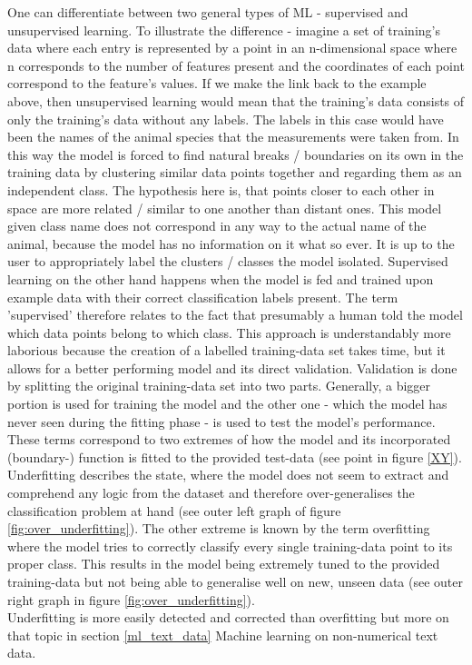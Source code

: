 One can differentiate between two general types of ML - supervised and unsupervised learning. To illustrate the difference - imagine a set of training's data where each entry is represented by a point in an n-dimensional space where n corresponds to the number of features present and the coordinates of each point correspond to the feature's values. If we make the link back to the example above, then unsupervised learning would mean that the training's data consists of only the training's data without any labels. The labels in this case would have been the names of the animal species that the measurements were taken from. In this way the model is forced to find natural breaks / boundaries on its own in the training data by clustering similar data points together and regarding them as an independent class. The hypothesis here is, that points closer to each other in space are more related / similar to one another than distant ones. This model given class name does not correspond in any way to the actual name of the animal, because the model has no information on it what so ever. It is up to the user to appropriately label the clusters / classes the model isolated.
Supervised learning on the other hand happens when the model is fed and trained upon example data with their correct classification labels present. The term 'supervised' therefore relates to the fact that presumably a human told the model which data points belong to which class. This approach is understandably more laborious because the creation of a labelled training-data set takes time, but it allows for a better performing model and its direct validation. Validation is done by splitting the original training-data set into two parts. Generally, a bigger portion is used for training the model and the other one - which the model has never seen during the fitting phase - is used to test the model's performance.\\
\newline
These terms correspond to two extremes of how the model and its incorporated (boundary-) function is fitted to the provided test-data (see point in figure \ref{XY}). Underfitting describes the state, where the model does not seem to extract and comprehend any logic from the dataset and therefore over-generalises the classification problem at hand (see outer left graph of figure \ref{fig:over_underfitting}). The other extreme is known by the term overfitting where the model tries to correctly classify every single training-data point to its proper class. This results in the model being extremely tuned to the provided training-data but not being able to generalise well on new, unseen data (see outer right graph in figure \ref{fig:over_underfitting}).\\
Underfitting is more easily detected and corrected than overfitting but more on that topic in section \ref{ml_text_data} Machine learning on non-numerical text data.

